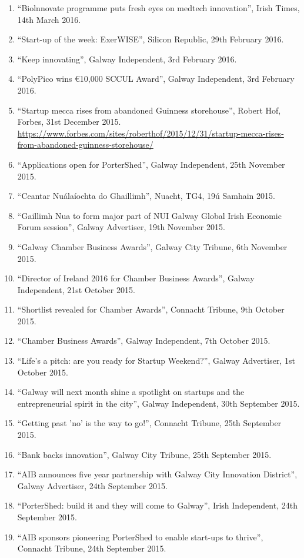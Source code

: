 \documentclass[10pt,a4paper]{res} %
\begin{document}
\begin{resume}
{\begin{enumerate}
\item ``Biolnnovate programme puts fresh eyes on medtech innovation'', Irish Times, 14th March 2016.
\item ``Start-up of the week: ExerWISE'', Silicon Republic, 29th February 2016.
\item ``Keep innovating'', Galway Independent, 3rd February 2016.
\item ``PolyPico wins \euro{}10,000 SCCUL Award'', Galway Independent, 3rd February 2016.
\item ``Startup mecca rises from abandoned Guinness storehouse'', Robert Hof, Forbes, 31st December 2015. \url{https://www.forbes.com/sites/roberthof/2015/12/31/startup-mecca-rises-from-abandoned-guinness-storehouse/}
\item ``Applications open for PorterShed'', Galway Independent, 25th November 2015.
\item ``Ceantar Nu\'{a}la\'{i}ochta do Ghaillimh'', Nuacht, TG4, 19\'{u} Samhain 2015.
\item ``Gaillimh Nua to form major part of NUI Galway Global Irish Economic Forum session'', Galway Advertiser, 19th November 2015.
\item ``Galway Chamber Business Awards'', Galway City Tribune, 6th November 2015.
\item ``Director of Ireland 2016 for Chamber Business Awards'', Galway Independent, 21st October 2015.
\item ``Shortlist revealed for Chamber Awards'', Connacht Tribune, 9th October 2015.
\item ``Chamber Business Awards'', Galway Independent, 7th October 2015.
\item ``Life's a pitch: are you ready for Startup Weekend?'', Galway Advertiser, 1st October 2015.
\item ``Galway will next month shine a spotlight on startups and the entrepreneurial spirit in the city'', Galway Independent, 30th September 2015.
\item ``Getting past 'no' is the way to go!'', Connacht Tribune, 25th September 2015.
\item ``Bank backs innovation'', Galway City Tribune, 25th September 2015.
\item ``AIB announces five year partnership with Galway City Innovation District'', Galway Advertiser, 24th September 2015.
\item ``PorterShed: build it and they will come to Galway'', Irish Independent, 24th September 2015.
\item ``AIB sponsors pioneering PorterShed to enable start-ups to thrive'', Connacht Tribune, 24th September 2015.

\end{enumerate}}
\end{resume}
\end{document}
